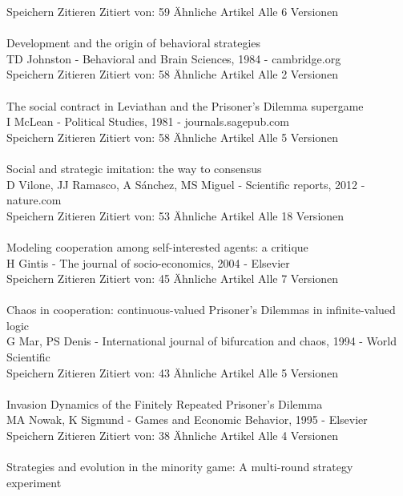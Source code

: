 \documentclass[11pt]{article}
\begin{document}
Speichern Zitieren Zitiert von: 59 Ähnliche Artikel Alle 6 Versionen\\
\\
\noindent 
Development and the origin of behavioral strategies\\
TD Johnston - Behavioral and Brain Sciences, 1984 - cambridge.org\\
Speichern Zitieren Zitiert von: 58 Ähnliche Artikel Alle 2 Versionen\\
\\
\noindent 
The social contract in Leviathan and the Prisoner's Dilemma supergame\\
I McLean - Political Studies, 1981 - journals.sagepub.com\\
Speichern Zitieren Zitiert von: 58 Ähnliche Artikel Alle 5 Versionen\\
\\
\noindent 
Social and strategic imitation: the way to consensus\\
D Vilone, JJ Ramasco, A Sánchez, MS Miguel - Scientific reports, 2012 - nature.com\\
Speichern Zitieren Zitiert von: 53 Ähnliche Artikel Alle 18 Versionen\\
\\
\noindent 
[HTML] Modeling cooperation among self-interested agents: a critique\\
H Gintis - The journal of socio-economics, 2004 - Elsevier\\
Speichern Zitieren Zitiert von: 45 Ähnliche Artikel Alle 7 Versionen\\
\\
\noindent 
Chaos in cooperation: continuous-valued Prisoner's Dilemmas in infinite-valued logic\\
G Mar, PS Denis - International journal of bifurcation and chaos, 1994 - World Scientific\\
Speichern Zitieren Zitiert von: 43 Ähnliche Artikel Alle 5 Versionen\\
\\
\noindent 
Invasion Dynamics of the Finitely Repeated Prisoner's Dilemma\\
MA Nowak, K Sigmund - Games and Economic Behavior, 1995 - Elsevier\\
Speichern Zitieren Zitiert von: 38 Ähnliche Artikel Alle 4 Versionen\\
\\
\noindent 
[HTML] Strategies and evolution in the minority game: A multi-round strategy experiment\\
\end{document}
